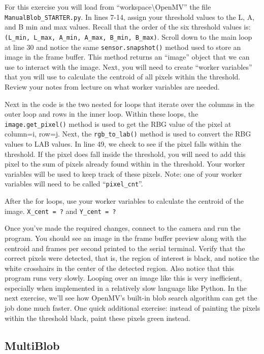 \documentclass[11pt]{article}
\begin{document}
For this exercise you will load from “workspace\textbackslash{}OpenMV” the file \texttt{ManualBlob\_STARTER.py}. In lines 7-14, assign your threshold values to the L, A, and B min and max values. Recall that the order of the six threshold values is: \texttt{(L_min, L_max, A_min, A_max, B_min, B_max)}. Scroll down to the main loop at line 30 and notice the same \texttt{sensor.snapshot()} method used to store an image in the frame buffer. This method returns an “image” object that we can use to interact with the image. Next, you will need to create “worker variables” that you will use to calculate the centroid of all pixels within the threshold. Review your notes from lecture on what worker variables are needed.

Next in the code is the two nested for loops that iterate over the columns in the outer loop and rows in the inner loop. Within these loops, the \texttt{image.get_pixel()} method is used to get the RBG value of the pixel at column=i, row=j. Next, the \texttt{rgb_to_lab()} method is used to convert the RBG values to LAB values. In line 49, we check to see if the pixel falls within the threshold. If the pixel does fall inside the threshold, you will need to add this pixel to the sum of pixels already found within in the threshold. Your worker variables will be used to keep track of these pixels. Note: one of your worker variables will need to be called “\texttt{pixel_cnt}”.

After the for loops, use your worker variables to calculate the centroid of the image. \texttt{X_cent = ?} and \texttt{Y_cent = ?}

Once you’ve made the required changes, connect to the camera and run the program. You should see an image in the frame buffer preview along with the centroid and frames per second printed to the serial terminal. Verify that the correct pixels were detected, that is, the region of interest is black, and notice the white crosshairs in the center of the detected region. Also notice that this program runs very slowly. Looping over an image like this is very inefficient, especially when implemented in a relatively slow language like Python. In the next exercise, we’ll see how OpenMV’s built-in blob search algorithm can get the job done much faster. One quick additional exercise: instead of painting the pixels within the threshold black, paint these pixels green instead.

\subsection*{MultiBlob}
\end{document}
